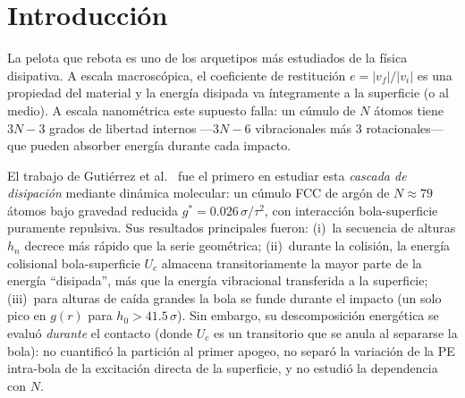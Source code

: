 \documentclass[12pt,a4paper]{article}
\newcommand{\cor}{e}
\newcommand{\gstar}{g^*}
\begin{document}
\begin{abstract}
Con interacción LJ completa ($c_{ps}=1$, adhesión), la bola pega en los
$4N\times6h_0=24$ casos estudiados ($v$ hasta $2.0\,\sigma/\tau$). La energía
de adhesión $E_{\rm adh}\propto N^{0.73}$ (área de contacto) supera
en todos los casos a la energía CM disponible tras el rebote; una
extrapolación de orden de magnitud sitúa el umbral en
$h_0^*(N)\sim260$--$440\,\sigma$ con $h_0^*\propto N^{-0.27}$.

\medskip
\noindent\textbf{Palabras clave:} dinámica molecular, nanocúmulos LJ,
coeficiente de restitución, partición energética, expansión anarmónica,
fonones de superficie, adhesión.
\end{abstract}

\section{Introducción}
\label{sec:intro}

La pelota que rebota es uno de los arquetipos más estudiados de la física
disipativa. A escala macroscópica, el coeficiente de restitución
$\cor = |v_f|/|v_i|$ es una propiedad del material y la energía disipada
va íntegramente a la superficie (o al medio). A escala nanométrica este
supuesto falla: un cúmulo de $N$ átomos tiene $3N-3$ grados de libertad
internos ---$3N-6$ vibracionales más 3 rotacionales--- que pueden absorber
energía durante cada impacto.

El trabajo de Gutiérrez et al.~\cite{Gutierrez2012} fue el primero en estudiar
esta \emph{cascada de disipación} mediante dinámica molecular: un cúmulo FCC
de argón de $N\approx79$ átomos bajo gravedad reducida $\gstar=0.026\,\sigma/\tau^2$,
con interacción bola-superficie puramente repulsiva. Sus resultados principales
fueron: (i)~la secuencia de alturas $h_n$ decrece más rápido que la serie
geométrica; (ii)~durante la colisión, la energía colisional bola-superficie
$U_c$ almacena transitoriamente la mayor parte de la energía ``disipada'',
más que la energía vibracional transferida a la superficie;
(iii)~para alturas de caída grandes la bola se funde durante el impacto
(un solo pico en $g(r)$ para $h_0>41.5\,\sigma$).
Sin embargo, su descomposición energética se evaluó \emph{durante} el
contacto (donde $U_c$ es un transitorio que se anula al separarse la bola):
no cuantificó la partición al primer apogeo, no separó la variación de la PE
intra-bola de la excitación directa de la superficie, y no estudió la
dependencia con $N$.
\end{document}
